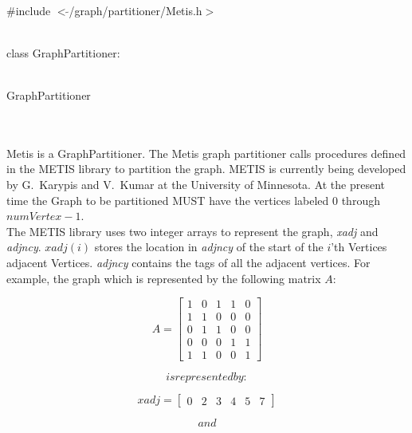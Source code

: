 
   \\
\#include $<\tilde{ }$/graph/partitioner/Metis.h$>$  


  \\
class GraphPartitioner:  


 \\
GraphPartitioner 

\indent{} \\

  \\
\indent Metis is a GraphPartitioner. The Metis graph partitioner calls
procedures defined in the METIS library to partition the graph. METIS
is currently being developed by G.~Karypis and V.~Kumar at the
University of Minnesota. At the present time the Graph to be
partitioned MUST have the vertices labeled $0$ through $numVertex-1$. \\

The METIS library uses two integer arrays to represent the graph, {\em
xadj} and {\em adjncy}. $xadj(i)$ stores the location in {\em adjncy}
of the start of the $i$'th Vertices adjacent Vertices. {\em adjncy}
contains the tags of all the adjacent vertices. For example, the graph
which is represented by the following matrix $A$:


$$ A =
\left[
\begin{array}{ccccc}
1 & 0 & 1 & 1 & 0  \\
1 & 1 & 0 & 0 & 0  \\
0 & 1 & 1 & 0 & 0 \\
0 & 0 & 0 & 1 & 1 \\
1 & 1 & 0 & 0 & 1
\end{array}
\right] 

$$

$$


is represented by:


$$

$$

xadj =
\left[
\begin{array}{cccccccccccccc}
0 & 2 & 3 & 4 & 5 & 7
\end{array}
\right] 

$$

$$


and


$$

$$

